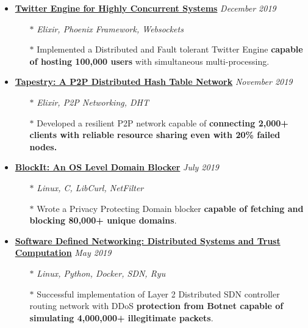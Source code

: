 \documentclass[10pt,a4paper]{article}
\begin{document}
\begin{tcolorbox}
\begin{itemize}[noitemsep,nolistsep,leftmargin=0pt]
	\item{\textbf{\href{https://gitlab.com/r0ck3r008/twitter-engine}{Twitter Engine for Highly Concurrent Systems}} \hfill \textit{December 2019}}
	\begin{itemize}[leftmargin=*]
	\setlength\itemsep{-0.25em}
	    \item[$\ast$]{\textit{Elixir, Phoenix Framework, Websockets}}
		\item[$\ast$]{Implemented a Distributed and Fault tolerant Twitter Engine \textbf{capable of hosting 100,000 users} with simultaneous multi-processing.}
	\end{itemize}
	
	\item{\textbf{\href{https://gitlab.com/r0ck3r008/dos-proj}{Tapestry: A P2P Distributed Hash Table Network}} \hfill \textit{November 2019}}
	\begin{itemize}[leftmargin=*]
	\setlength\itemsep{-0.25em}
	    \item[$\ast$]{\textit{Elixir, P2P Networking, DHT}}
	    \item[$\ast$]{Developed a resilient P2P network capable of \textbf{connecting 2,000+ clients with reliable resource sharing even with 20\% failed nodes.}}
	\end{itemize}
	
	\item{\textbf{\href{https://gitlab.com/r0ck3r008/blockit}{BlockIt: An OS Level Domain Blocker}} \hfill \textit{July 2019}}
	\begin{itemize}[leftmargin=*]
	\setlength\itemsep{-0.25em}
	    \item[$\ast$]{\textit{Linux, C, LibCurl, NetFilter}}
	    \item[$\ast$]{Wrote a Privacy Protecting Domain blocker \textbf{capable of fetching and blocking 80,000+ unique domains}.}
	\end{itemize}
	
	\item{\textbf{\href{https://gitlab.com/r0ck3r008/sdn-proj}{Software Defined Networking: Distributed Systems and Trust Computation}} \hfill \textit{May 2019}}
	\begin{itemize}[leftmargin=*]
	\setlength\itemsep{-0.25em}
	    \item[$\ast$]{\textit{Linux, Python, Docker, SDN, Ryu}}
		\item[$\ast$]{Successful implementation of Layer 2 Distributed SDN controller routing network with DDoS \textbf{protection from Botnet capable of simulating 4,000,000+ illegitimate packets}.}
	\end{itemize}
	
	\end{itemize}

\end{tcolorbox}
\end{document}
